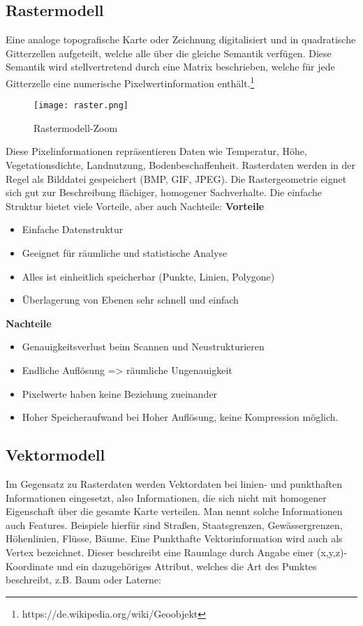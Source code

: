 \documentclass[11pt,fleqn]{book} %
\begin{document}
\subsection{Rastermodell}
Eine analoge topografische Karte oder Zeichnung digitalisiert und in quadratische Gitterzellen aufgeteilt, welche alle über die gleiche Semantik verfügen. Diese Semantik wird stellvertretend durch eine Matrix beschrieben, welche für jede Gitterzelle eine numerische Pixelwertinformation enthält.\footnote{https://de.wikipedia.org/wiki/Geoobjekt}
\begin{figure}[H]
\centering
\texttt{[image: raster.png]}
\caption{Rastermodell-Zoom \protect\footnotemark}
\end{figure}
\noindent
Diese Pixelinformationen repräsentieren Daten wie  Temperatur, Höhe, Vegetationsdichte, Landnutzung, Bodenbeschaffenheit. Rasterdaten werden in der Regel als Bilddatei gespeichert (BMP, GIF, JPEG).
\newline
Die Rastergeometrie eignet sich gut zur Beschreibung flächiger, homogener Sachverhalte. Die einfache Struktur bietet viele Vorteile, aber auch Nachteile: \newline
\textbf{Vorteile}
\begin{itemize}
\item Einfache Datenstruktur 
\item Geeignet für räumliche und statistische Analyse
\item Alles ist einheitlich speicherbar (Punkte, Linien, Polygone)
\item Überlagerung von Ebenen sehr schnell und einfach
\end{itemize}
\textbf{Nachteile}
\begin{itemize}
\item Genauigkeitsverlust beim Scannen und Neustrukturieren
\item Endliche Auflösung => räumliche Ungenauigkeit
\item Pixelwerte haben keine Beziehung zueinander
\item Hoher Speicheraufwand bei Hoher Auflösung, keine Kompression möglich.
\end{itemize}

\subsection{Vektormodell}
Im Gegensatz zu Rasterdaten werden Vektordaten bei linien- und punkthaften Informationen eingesetzt, also Informationen, die sich nicht mit homogener Eigenschaft über die gesamte Karte verteilen. Man nennt solche Informationen auch Features. Beispiele hierfür sind Straßen, Staatsgrenzen, Gewässergrenzen, Höhenlinien, Flüsse, Bäume.
\newline
Eine Punkthafte Vektorinformation wird auch als Vertex bezeichnet. Dieser beschreibt eine Raumlage durch Angabe einer (x,y,z)-Koordinate und ein dazugehöriges Attribut, welches die Art des Punktes beschreibt, z.B. Baum oder Laterne:
\end{document}
